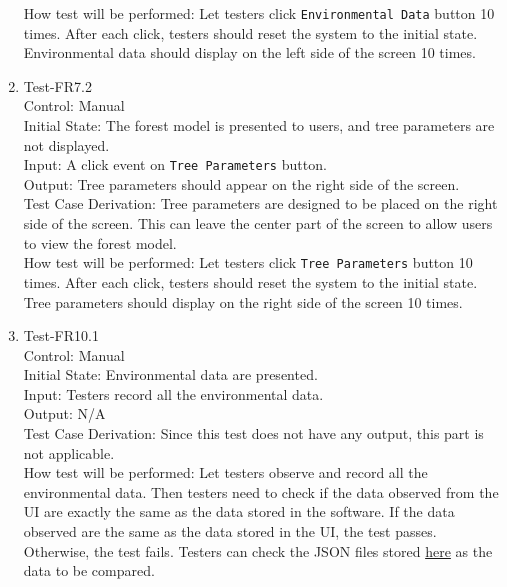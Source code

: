 \documentclass[12pt, titlepage]{article}
\begin{document}
\begin{enumerate}
How test will be performed: Let testers click 
\verb|Environmental Data| button 10 times. After each click, testers 
should reset the system to the initial state. Environmental data 
should display on the left side of the screen 10 times.

\item{Test-FR7.2\\}
Control: Manual\\ 

Initial State: The forest model is presented to users, and 
tree parameters are not displayed.\\

Input: A click event on \verb|Tree Parameters| button.\\

Output: Tree parameters should appear on the right side of the 
screen.\\

Test Case Derivation: Tree parameters are designed to be placed
on the right side of the screen. This can leave the center part 
of the screen to allow users to view the forest model.\\
					
How test will be performed: Let testers click 
\verb|Tree Parameters| button 10 times. After each click, testers 
should reset the system to the initial state. Tree parameters
should display on the right side of the screen 10 times.

\item{Test-FR10.1\\}
Control: Manual\\ 

Initial State: Environmental data are presented.\\

Input: Testers record all the environmental data.\\

Output: N/A\\

Test Case Derivation: Since this test does not have any output, this 
part is not applicable.\\
					
How test will be performed: Let testers observe and record all the 
environmental data. Then testers need to check if the data observed
from the UI are exactly the same as the data stored in the software. 
If the data observed are the same as the data stored in the UI, 
the test passes. Otherwise, the test fails. Testers can check the JSON
files stored \href{https://github.com/tingyushi/DTForest-DS}{here}
as the data to be compared. 


\end{enumerate}
\end{document}
